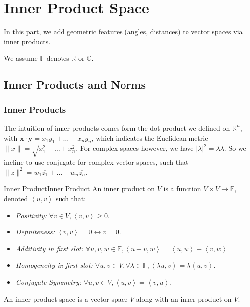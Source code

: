 \documentclass[../main.tex]{subfiles}
\begin{document}
\chapter{Inner Product Space}

In this part, we add geometric features (angles, distances) to vector spaces via inner products.

\begin{plainblackenv}
We assume $\mathbb{F}$ denotes $\mathbb{R}$ or $\mathbb{C}$.
\end{plainblackenv}

\section{Inner Products and Norms}
\subsection{Inner Products}
The intuition of inner products comes form the dot product we defined on $\mathbb{R}^n$, with $\boldsymbol{x}\cdot \boldsymbol{y} = x_1y_1+\ldots +x_ny_n$, which indicates the Euclidean metric $\| x \| = \sqrt{x_1^2+\ldots +x_n^2}$. For complex spaces however, we have $\left|\lambda\right|^2 = \lambda \overline{\lambda}$. So we incline to use conjugate for complex vector spaces, such that $\|z\|^2 = w_1\overline{z_1}+\ldots +w_n \overline{z_n}$.

\begin{definition}{Inner Product}{Inner Product}
An inner product on $V$ is a function $V \times V \rightarrow  \mathbb{F}$, denoted $\left<u,v\right>$ such that:
\begin{itemize}
\item \emph{Positivity: } $\forall v\in V, \left<v,v\right> \geq 0$.
\item \emph{Definiteness:} $\left<v,v\right> = 0 \leftrightarrow v=0$.
\item \emph{Additivity in first slot:} $\forall u,v,w\in \mathbb{F},\left<u+v,w\right> = \left<u,w\right> + \left<v,w\right>$
\item  \emph{Homogeneity in first slot:} $\forall u,v\in V, \forall \lambda \in \mathbb{F}, \left<\lambda u,v\right> = \lambda \left<u,v\right>.$
\item \emph{Conjugate Symmetry:} $\forall u,v\in V, \left<u,v\right> = \overline{\left<v,u\right>}$.
\end{itemize}

An inner product space is a vector space $V$ along with  an inner product on $V$.
\end{definition}
\end{document}
